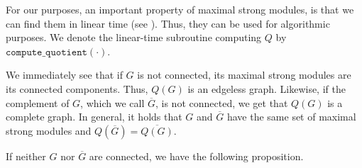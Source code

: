 \documentclass{article}
\theoremstyle{definition}
\begin{document}
    For our purposes, an important
    property of maximal strong modules,
    is that we can find them in linear
    time (see \cite{linear_modules}).
    Thus, they can be used for algorithmic
    purposes.
    We denote the linear-time
    subroutine computing
    $Q$ by $\texttt{compute\_quotient}\left(\cdot\right)$.

    We immediately see that
    if $G$ is not connected, its 
    maximal strong modules are
    its connected components. 
    Thus, $Q\left(G\right)$ is
    an edgeless graph.
    Likewise,
    if the complement of $G$,
    which we call $\overline{G}$, is
    not connected, we get
    that $Q\left(G\right)$ is 
    a complete graph. In general, 
    it holds that
    $G$ and $\overline{G}$ 
    have the same set of maximal
    strong modules
    and $Q\left(\overline{G}\right) = \overline{Q\left(G\right)}$. 

    If neither $G$
    nor $\overline{G}$ are
    connected, we have the following
    proposition.
\end{document}

